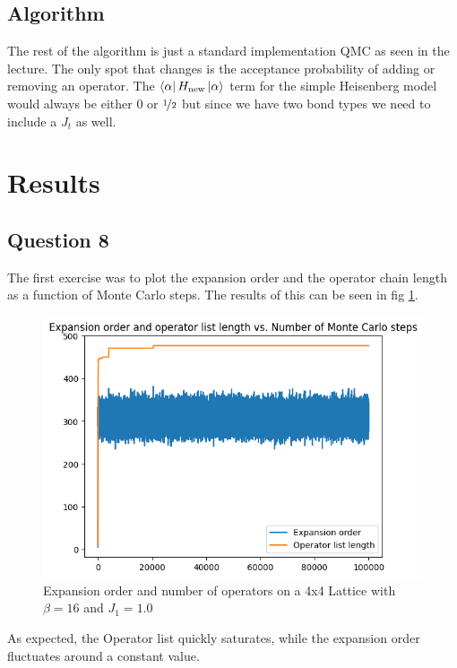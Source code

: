 \documentclass[ngerman]{scrartcl}
\begin{document}
\subsection*{Algorithm}
The rest of the algorithm is just a standard implementation QMC as seen in the lecture. The only spot that changes is the acceptance probability of adding or removing an operator. The $\bra{\alpha}H_\text{new}\ket{\alpha}$ term for the simple Heisenberg model would always be either 0 or $\nicefrac{1}{2}$ but since we have two bond types we need to include a $J_t$ as well.
\section*{Results}
\subsection*{Question 8}
The first exercise was to plot the expansion order and the operator chain length as a function of Monte Carlo steps. The results of this can be seen in fig \ref{fig:expansion}.
\begin{figure}[H]
        \centering
        \includegraphics[width=1.0\textwidth]{expansion.png}
        \caption{Expansion order and number of operators on a 4x4 Lattice with $\beta=16$ and $J_1=1.0$}
        \label{fig:expansion}
    \end{figure}    
As expected, the Operator list quickly saturates, while the expansion order fluctuates around a constant value.
\end{document}
